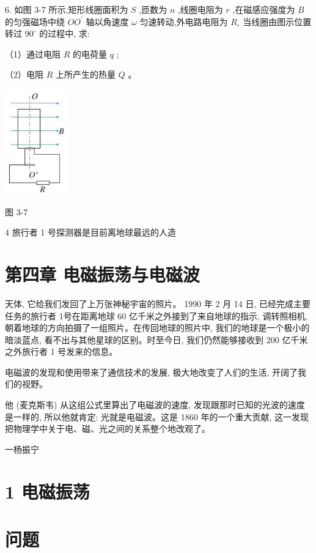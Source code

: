 \documentclass[10pt]{article}
\begin{document}
6. 如图 3-7 所示,矩形线圈面积为 \(S\) ,匝数为 \(n\) ,线圈电阻为 \(r\) ,在磁感应强度为 \(B\) 的匀强磁场中绕 \(O{O}^{\prime }\) 轴以角速度 \(\omega\) 匀速转动,外电路电阻为 \({R}_{ \circ }\) 当线圈由图示位置转过 \({90}^{ \circ }\) 的过程中, 求:

（1）通过电阻 \(R\) 的电荷量 \(q\) ;

（2）电阻 \(R\) 上所产生的热量 \(Q\) 。

\begin{center}
\includegraphics[max width=0.2\textwidth]{images/01910e72-c5b7-7ed5-a6d4-fb3a5faefc32_74_460144.jpg}
\end{center}

图 3-7

4 旅行者 1 号探测器是目前离地球最远的人造

\section*{第四章 电磁振荡与电磁波}

天体, 它给我们发回了上万张神秘宇宙的照片。 1990 年 2 月 14 日, 已经完成主要任务的旅行者 1号在距离地球 60 亿千米之外接到了来自地球的指示, 调转照相机, 朝着地球的方向拍摄了一组照片。在传回地球的照片中, 我们的地球是一个极小的暗淡蓝点, 看不出与其他星球的区别。时至今日, 我们仍然能够接收到 200 亿千米之外旅行者 1 号发来的信息。

电磁波的发现和使用带来了通信技术的发展, 极大地改变了人们的生活, 开阔了我们的视野。

他 (麦克斯韦) 从这组公式里算出了电磁波的速度, 发现跟那时已知的光波的速度是一样的, 所以他就肯定: 光就是电磁波。这是 1860 年的一个重大贡献, 这一发现把物理学中关于电、磁、光之间的关系整个地改观了。

一杨振宁

\section*{1 电磁振荡}

\section*{问题}
\end{document}
